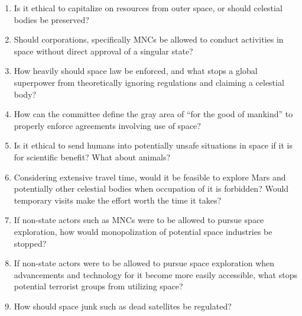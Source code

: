 \documentclass[10pt, letterpaper]{article}
\begin{document}
\begin{enumerate}
\def\labelenumi{\arabic{enumi}.}
\item
  
  Is it ethical to capitalize on resources from outer space, or should
  celestial bodies be preserved?
  
\item
  
  Should corporations, specifically MNCs be allowed to conduct
  activities in space without direct approval of a singular state?
  
\item
  
  How heavily should space law be enforced, and what stops a global
  superpower from theoretically ignoring regulations and claiming a
  celestial body?
  
\item
  
  How can the committee define the gray area of ``for the good of
  mankind'' to properly enforce agreements involving use of space?
  
\item
  
  Is it ethical to send humans into potentially unsafe situations in
  space if it is for scientific benefit? What about animals?
  
\item
  
  Considering extensive travel time, would it be feasible to explore
  Mars and potentially other celestial bodies when occupation of it is
  forbidden? Would temporary visits make the effort worth the time it
  takes?
  
\item
  
  If non-state actors such as MNCs were to be allowed to pursue space
  exploration, how would monopolization of potential space industries be
  stopped?
  
\item
  
  If non-state actors were to be allowed to pursue space exploration
  when advancements and technology for it become more easily accessible,
  what stops potential terrorist groups from utilizing space?
  
\item
  
  How should space junk such as dead satellites be regulated?
  
\end{enumerate}
\end{document}
